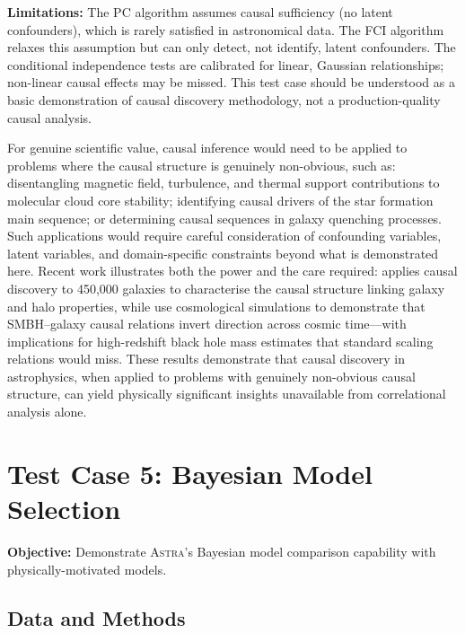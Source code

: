 \documentclass[usenatbib]{rasti}
\newcommand{\astra}{\textsc{Astra}\xspace}
\newcommand{\pc}{PC\xspace}
\newcommand{\fci}{FCI\xspace}
\begin{document}
\textbf{Limitations:}
The \pc algorithm assumes causal sufficiency (no latent confounders), which is rarely satisfied in astronomical data.
The \fci algorithm relaxes this assumption but can only detect, not identify, latent confounders.
The conditional independence tests are calibrated for linear, Gaussian relationships; non-linear causal effects may be missed.
This test case should be understood as a basic demonstration of causal discovery methodology, not a production-quality causal analysis.

For genuine scientific value, causal inference would need to be applied to problems where the causal structure is genuinely non-obvious, such as: disentangling magnetic field, turbulence, and thermal support contributions to molecular cloud core stability; identifying causal drivers of the star formation main sequence; or determining causal sequences in galaxy quenching processes.
Such applications would require careful consideration of confounding variables, latent variables, and domain-specific constraints beyond what is demonstrated here.
Recent work illustrates both the power and the care required: \citet{Desmond2026} applies causal discovery to 450,000 galaxies to characterise the causal structure linking galaxy and halo properties, while \citet{Davis2026} use cosmological simulations to demonstrate that SMBH--galaxy causal relations invert direction across cosmic time---with implications for high-redshift black hole mass estimates that standard scaling relations would miss.
These results demonstrate that causal discovery in astrophysics, when applied to problems with genuinely non-obvious causal structure, can yield physically significant insights unavailable from correlational analysis alone.

\section{Test Case 5: Bayesian Model Selection}
\label{sec:tc5}

\textbf{Objective:} Demonstrate \astra's Bayesian model comparison capability with physically-motivated models.

\subsection{Data and Methods}
\label{sec:tc5:data}
\end{document}
